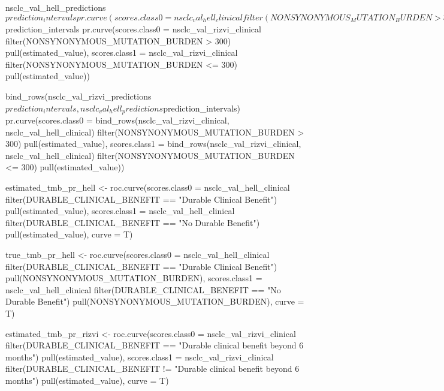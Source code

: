 {nsclc_val_hell_predictions$prediction_intervals %
  {pr.curve(scores.class0 = nsclc_val_hell_clinical %
              filter(NONSYNONYMOUS_MUTATION_BURDEN > 300) %
              pull(estimated_value),
            scores.class1 = nsclc_val_hell_clinical %
              filter(NONSYNONYMOUS_MUTATION_BURDEN <= 300) %
              pull(estimated_value))}


nsclc_val_rizvi_predictions$prediction_intervals %
  {pr.curve(scores.class0 = nsclc_val_rizvi_clinical %
              filter(NONSYNONYMOUS_MUTATION_BURDEN > 300) %
              pull(estimated_value),
            scores.class1 = nsclc_val_rizvi_clinical %
              filter(NONSYNONYMOUS_MUTATION_BURDEN <= 300) %
              pull(estimated_value))}

bind_rows(nsclc_val_rizvi_predictions$prediction_intervals, nsclc_val_hell_predictions$prediction_intervals) %
  {pr.curve(scores.class0 = bind_rows(nsclc_val_rizvi_clinical, nsclc_val_hell_clinical) %
              filter(NONSYNONYMOUS_MUTATION_BURDEN > 300) %
              pull(estimated_value),
            scores.class1 = bind_rows(nsclc_val_rizvi_clinical, nsclc_val_hell_clinical) %
              filter(NONSYNONYMOUS_MUTATION_BURDEN <= 300) %
              pull(estimated_value))}


estimated_tmb_pr_hell <- roc.curve(scores.class0 = nsclc_val_hell_clinical %
                                     filter(DURABLE_CLINICAL_BENEFIT == "Durable Clinical Benefit") %
                                     pull(estimated_value),
                                   scores.class1 = nsclc_val_hell_clinical %
                                     filter(DURABLE_CLINICAL_BENEFIT == "No Durable Benefit") %
                                     pull(estimated_value),
                                   curve = T)

true_tmb_pr_hell <- roc.curve(scores.class0 = nsclc_val_hell_clinical %
                                filter(DURABLE_CLINICAL_BENEFIT == "Durable Clinical Benefit") %
                                pull(NONSYNONYMOUS_MUTATION_BURDEN),
                              scores.class1 = nsclc_val_hell_clinical %
                                filter(DURABLE_CLINICAL_BENEFIT == "No Durable Benefit") %
                                pull(NONSYNONYMOUS_MUTATION_BURDEN),
                              curve = T)

estimated_tmb_pr_rizvi <- roc.curve(scores.class0 = nsclc_val_rizvi_clinical %
                                     filter(DURABLE_CLINICAL_BENEFIT == "Durable clinical benefit beyond 6 months") %
                                     pull(estimated_value),
                                   scores.class1 = nsclc_val_rizvi_clinical %
                                     filter(DURABLE_CLINICAL_BENEFIT != "Durable clinical benefit beyond 6 months") %
                                     pull(estimated_value),
                                   curve = T)

}
